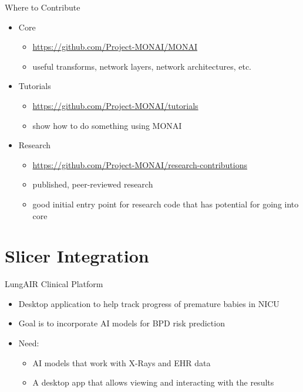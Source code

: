 \documentclass[10pt,aspectratio=169,dvipsnames]{beamer}
\begin{document}
\begin{frame}{Where to Contribute}
\begin{itemize}
	\item Core
	\begin{itemize}
		\item \url{https://github.com/Project-MONAI/MONAI}
		\item useful transforms, network layers, network architectures, etc.
	\end{itemize}
	\item Tutorials
	\begin{itemize}
		\item \url{https://github.com/Project-MONAI/tutorials}
		\item show how to do something using MONAI
	\end{itemize}
	\item Research
	\begin{itemize}
		\item \url{https://github.com/Project-MONAI/research-contributions}
		\item published, peer-reviewed research
		\item good initial entry point for research code that has potential for going into core
	\end{itemize}
\end{itemize}
\end{frame}


\section{Slicer Integration}

\begin{frame}{LungAIR Clinical Platform}
\begin{itemize}
	\item Desktop application to help track progress of premature babies in NICU
	\item Goal is to incorporate AI models for BPD risk prediction
	\item Need:
	\begin{itemize}
		\item AI models that work with X-Rays and EHR data \only<2,3,4>{$\rightsquigarrow$ \textbf{MONAI}} 
		\item A desktop app that allows viewing and interacting with the results \only<3,4>{$\rightsquigarrow$ \textbf{3D Slicer}} 
	\end{itemize}
\end{itemize}
\end{frame}
\end{document}
